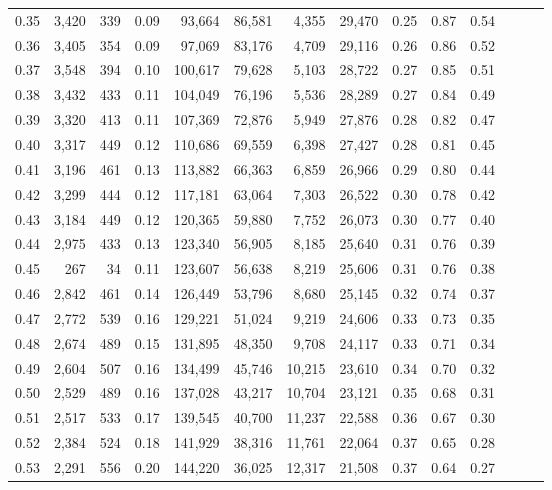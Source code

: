 \begin{tabular}{rrrrrrrrrrrrrr}
0.35 &  3,420 &  339 &  0.09 &   93,664 &   86,581 &   4,355 &  29,470 &  0.25 &  0.87 &      0.54 \\
0.36 &  3,405 &  354 &  0.09 &   97,069 &   83,176 &   4,709 &  29,116 &  0.26 &  0.86 &      0.52 \\
0.37 &  3,548 &  394 &  0.10 &  100,617 &   79,628 &   5,103 &  28,722 &  0.27 &  0.85 &      0.51 \\
0.38 &  3,432 &  433 &  0.11 &  104,049 &   76,196 &   5,536 &  28,289 &  0.27 &  0.84 &      0.49 \\
0.39 &  3,320 &  413 &  0.11 &  107,369 &   72,876 &   5,949 &  27,876 &  0.28 &  0.82 &      0.47 \\
0.40 &  3,317 &  449 &  0.12 &  110,686 &   69,559 &   6,398 &  27,427 &  0.28 &  0.81 &      0.45 \\
0.41 &  3,196 &  461 &  0.13 &  113,882 &   66,363 &   6,859 &  26,966 &  0.29 &  0.80 &      0.44 \\
0.42 &  3,299 &  444 &  0.12 &  117,181 &   63,064 &   7,303 &  26,522 &  0.30 &  0.78 &      0.42 \\
0.43 &  3,184 &  449 &  0.12 &  120,365 &   59,880 &   7,752 &  26,073 &  0.30 &  0.77 &      0.40 \\
0.44 &  2,975 &  433 &  0.13 &  123,340 &   56,905 &   8,185 &  25,640 &  0.31 &  0.76 &      0.39 \\
0.45 &    267 &   34 &  0.11 &  123,607 &   56,638 &   8,219 &  25,606 &  0.31 &  0.76 &      0.38 \\
0.46 &  2,842 &  461 &  0.14 &  126,449 &   53,796 &   8,680 &  25,145 &  0.32 &  0.74 &      0.37 \\
0.47 &  2,772 &  539 &  0.16 &  129,221 &   51,024 &   9,219 &  24,606 &  0.33 &  0.73 &      0.35 \\
0.48 &  2,674 &  489 &  0.15 &  131,895 &   48,350 &   9,708 &  24,117 &  0.33 &  0.71 &      0.34 \\
0.49 &  2,604 &  507 &  0.16 &  134,499 &   45,746 &  10,215 &  23,610 &  0.34 &  0.70 &      0.32 \\
0.50 &  2,529 &  489 &  0.16 &  137,028 &   43,217 &  10,704 &  23,121 &  0.35 &  0.68 &      0.31 \\
0.51 &  2,517 &  533 &  0.17 &  139,545 &   40,700 &  11,237 &  22,588 &  0.36 &  0.67 &      0.30 \\
0.52 &  2,384 &  524 &  0.18 &  141,929 &   38,316 &  11,761 &  22,064 &  0.37 &  0.65 &      0.28 \\
0.53 &  2,291 &  556 &  0.20 &  144,220 &   36,025 &  12,317 &  21,508 &  0.37 &  0.64 &      0.27 \\

\end{tabular}
